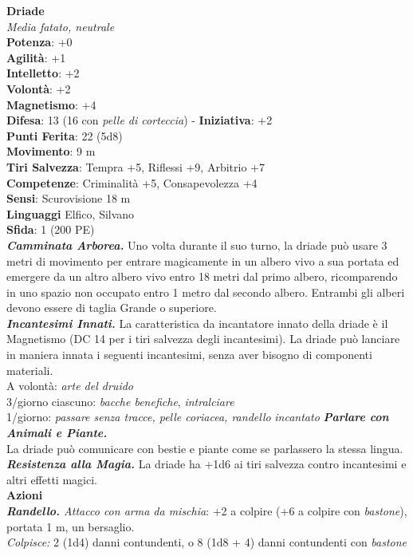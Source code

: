 \begin{multicols}{2}
\medskip\textbf{Driade}\\
\emph{Media fatato, neutrale}\\
\textbf{Potenza}: +0\\
\textbf{Agilità}: +1\\
\textbf{Intelletto}: +2\\
\textbf{Volontà}: +2\\
\textbf{Magnetismo}: +4\\
\textbf{Difesa}: 13 (16 con \emph{pelle di corteccia}) - \textbf{Iniziativa}: +2\\
\textbf{Punti Ferita}: 22 (5d8)\\
\textbf{Movimento}: 9 m\\
\textbf{Tiri Salvezza}: Tempra +5, Riflessi +9, Arbitrio +7\\
\textbf{Competenze}: Criminalità +5, Consapevolezza +4\\
\textbf{Sensi}: Scurovisione 18 m\\
\textbf{Linguaggi} Elfico, Silvano\\
\textbf{Sfida}: 1 (200 PE)\smallskip\\
\emph{\textbf{Camminata Arborea.}} Uno volta durante il suo turno, la driade può usare 3 metri di movimento per entrare magicamente in un albero vivo a sua portata ed emergere da un altro albero vivo entro 18 metri dal primo albero, ricomparendo in uno spazio non occupato entro 1 metro dal secondo albero. Entrambi gli alberi devono essere di taglia Grande o superiore.\\
\emph{\textbf{Incantesimi Innati.}} La caratteristica da incantatore innato della driade è il Magnetismo (DC 14 per i tiri salvezza degli incantesimi). La driade può lanciare in maniera innata i seguenti incantesimi, senza aver bisogno di componenti materiali.\\
A volontà: \emph{arte del druido}\\
3/giorno ciascuno: \emph{bacche benefiche}, \emph{intralciare}\\
1/giorno: \emph{passare senza tracce, pelle coriacea, randello} \emph{incantato} \emph{\textbf{Parlare con Animali e Piante.}}\\
La driade può comunicare con bestie e piante come se parlassero la stessa lingua.\\
\emph{\textbf{Resistenza alla Magia.}} La driade ha +1d6 ai tiri salvezza contro incantesimi e altri effetti magici.\\
\smallskip\textbf{Azioni}\\
\emph{\textbf{Randello.} Attacco con arma da mischia}: +2 a colpire (+6 a colpire con \emph{bastone}), portata 1 m, un bersaglio.\\
\emph{Colpisce:} 2 (1d4) danni contundenti, o 8 (1d8 + 4) danni contundenti con \emph{bastone}\\


\end{multicols}
